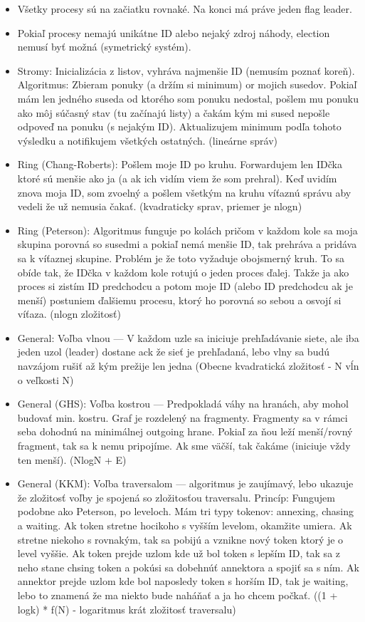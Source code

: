\documentclass[paper=a4, fontsize=11pt]{scrartcl} %
\numberwithin{equation}{section} %
\numberwithin{figure}{section} %
\numberwithin{table}{section} %
\begin{document}
	\begin{itemize}
		\item Všetky procesy sú na začiatku rovnaké. Na konci má práve jeden flag leader.
		\item Pokiaľ procesy nemajú unikátne ID alebo nejaký zdroj náhody, election nemusí byť možná (symetrický systém).
		\item Stromy: Inicializácia z listov, vyhráva najmenšie ID (nemusím poznať koreň). Algoritmus: Zbieram ponuky (a držím si minimum) or mojich susedov. Pokiaľ mám len jedného suseda od ktorého som ponuku nedostal, pošlem mu ponuku ako môj súčasný stav (tu začínajú listy) a čakám kým mi sused nepošle odpoveď na ponuku (s nejakým ID). Aktualizujem minimum podľa tohoto výsledku a notifikujem všetkých ostatných. (lineárne správ)
		\item Ring (Chang-Roberts): Pošlem moje ID po kruhu. Forwardujem len IDčka ktoré sú menšie ako ja (a ak ich vidím viem že som prehral). Keď uvidím znova moja ID, som zvoelný a pošlem všetkým na kruhu víťaznú správu aby vedeli že už nemusia čakať. (kvadraticky sprav, priemer je nlogn) 
		\item Ring (Peterson): Algoritmus funguje po kolách pričom v každom kole sa moja skupina porovná so susedmi a pokiaľ nemá menšie ID, tak prehráva a pridáva sa k víťaznej skupine. Problém je že toto vyžaduje obojsmerný kruh. To sa obíde tak, že IDčka v každom kole rotujú o jeden proces ďalej. Takže ja ako proces si zistím ID predchodcu a potom moje ID (alebo ID predchodcu ak je menší) postuniem ďalšiemu procesu, ktorý ho porovná so sebou a osvojí si víťaza. (nlogn zložitosť)
		\item General: Voľba vlnou — V každom uzle sa iniciuje prehľadávanie siete, ale iba jeden uzol (leader) dostane ack že sieť je prehľadaná, lebo vlny sa budú navzájom rušiť až kým prežije len jedna (Obecne kvadratická zložitosť - N vĺn o veľkosti N)
		\item General (GHS): Voľba kostrou — Predpokladá váhy na hranách, aby mohol budovať min. kostru. Graf je rozdelený na fragmenty. Fragmenty sa v rámci seba dohodnú na minimálnej outgoing hrane. Pokiaľ za ňou leží menší/rovný fragment, tak sa k nemu pripojíme. Ak sme väčší, tak čakáme (iniciuje vždy ten menší). (NlogN + E)
		\item General (KKM): Voľba traversalom — algoritmus je zaujímavý, lebo ukazuje že zložitosť voľby je spojená so zložitosťou traversalu. Princíp: Fungujem podobne ako Peterson, po leveloch. Mám tri typy tokenov: annexing, chasing a waiting. Ak token stretne hocikoho s vyšším levelom, okamžite umiera. Ak stretne niekoho s rovnakým, tak sa pobijú a vznikne nový token ktorý je o level vyššie. Ak token prejde uzlom kde už bol token s lepším ID, tak sa z neho stane chsing token a pokúsi sa dobehnúť annektora a spojiť sa s ním. Ak annektor prejde uzlom kde bol naposledy token s horším ID, tak je waiting, lebo to znamená že ma niekto bude naháňať a ja ho chcem počkať. ((1 + logk) * f(N) - logaritmus krát zložitosť traversalu)
	\end{itemize}
\end{document}

